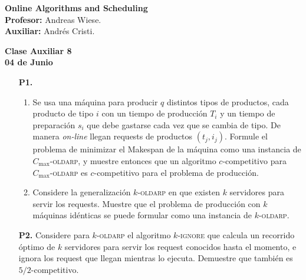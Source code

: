 \documentclass[11pt, spanish]{article}
\theoremstyle{plain}
\begin{document}

\begin{flushleft}
  \textbf{Online Algorithms and Scheduling}
  \\\textbf{Profesor:} Andreas Wiese.
  \\\textbf{Auxiliar:} Andrés Cristi.
\end{flushleft}


\begin{center}
  \large{\textbf{Clase Auxiliar 8\\ 04 de Junio}}
\end{center}




\begin{itemize}
	\item[\textbf{P1.}] 
	\begin{enumerate}
	    \item Se usa una máquina para producir $q$
    	distintos tipos de productos, cada producto de
    	tipo $i$ con un tiempo
    	de producción $T_i$ y un tiempo de preparación $s_i$
    	que debe gastarse cada vez que se cambia de tipo.
    	De manera \textit{on-line} llegan requests de productos
    	$(t_j,i_j)$. Formule el problema de minimizar
    	el Makespan de la máquina como una instancia de
    	$C_{\max}$-\textsc{oldarp}, y muestre entonces
    	que un algoritmo $c$-competitivo para $C_{\max}$-\textsc{oldarp} es $c$-competitivo
    	para el problema de producción.
	    \item Considere la generalización
	    $k$-\textsc{oldarp} en que existen $k$ servidores
	    para servir los requests. Muestre que el problema
	    de producción con $k$ máquinas idénticas se puede
	    formular como una instancia de $k$-\textsc{oldarp}.
	\end{enumerate}
	
	\item[\textbf{P2.}] Considere para $k$-\textsc{oldarp}
	el algoritmo $k$-\textsc{ignore} que calcula un
	recorrido óptimo de $k$ servidores
	para servir los request conocidos hasta el momento,
	e ignora los request que llegan mientras lo ejecuta.
	Demuestre que también es $5/2$-competitivo.
	
    
    
\end{itemize}
\end{document}
